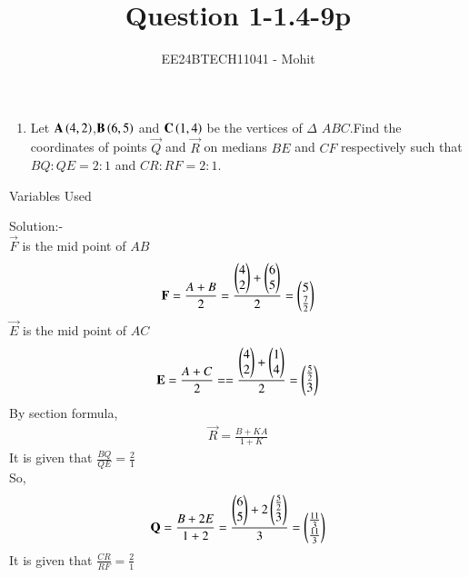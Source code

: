 \documentclass[journal]{IEEEtran}
\numberwithin{equation}{enumi}
\numberwithin{figure}{enumi}
\begin{document}

\title{Question 1-1.4-9p}
\author{EE24BTECH11041 - Mohit}
{\let\newpage\relax\maketitle}
\begin{enumerate}
	\item Let $\mathbf{A}\left(4,2\right)$,$\mathbf{B}\left(6,5\right)$ and $\mathbf{C}\left(1,4\right)$ be the vertices of $\Delta$ $ABC$.Find the coordinates of points $\vec{Q}$ and $\vec{R}$ on medians $BE$ and $CF$ respectively such that $BQ:QE=2:1$ and $CR:RF=2:1$.
\end{enumerate}
\begin{table}[h!]    
  \centering
  
  \caption{Variables Used}
  \label{tab 1.4.9.2}
\end{table}
Solution:-\\
$\vec{F}$ is the mid point of $AB$\\
\begin{align}
	\mathbf{F}=\frac{A+B}{2}=\frac{\begin{pmatrix}4\\2\end{pmatrix} + \begin{pmatrix}6\\5\end{pmatrix}}{2}
=\begin{pmatrix}5\\ \frac{7}{2}\end{pmatrix}
\end{align}
$\vec{E}$ is the mid point of $AC$\\
\begin{align}
	\mathbf{E}=\frac{A+C}{2}==\frac{\begin{pmatrix}4\\2\end{pmatrix} + \begin{pmatrix}1\\4\end{pmatrix}}{2}
=\begin{pmatrix}\frac{5}{2}\\3\end{pmatrix}
\end{align}
By section formula,
\begin{align}
	\vec{R}=\frac{B+KA}{1+K}
\end{align}
It is given that $\frac{BQ}{QE}=\frac{2}{1}$\\
So,\\
\begin{align}
	\mathbf{Q}=\frac{B+2E}{1+2}=\frac{\begin{pmatrix}6\\5\end{pmatrix} + 2\begin{pmatrix}\frac{5}{2}\\3\end{pmatrix}}{3}=\begin{pmatrix}\frac{11}{3}\\ \frac{11}{3}\end{pmatrix}
\end{align}
It is given that $\frac{CR}{RF}=\frac{2}{1}$\\
\end{document}
